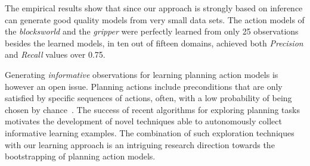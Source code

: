 \documentclass{article}
\begin{document}
The empirical results show that since our approach is strongly based on inference can generate good quality models from very small data sets. The action models of the {\em blocksworld} and the {\em gripper} were perfectly learned from only 25 observations besides the learned models, in ten out of fifteen domains, achieved both {\em Precision} and {\em Recall} values over 0.75.

Generating {\em informative} observations for learning planning action models is however an open issue. Planning actions include preconditions that are only satisfied by specific sequences of actions, often, with a low probability of being chosen by chance~\cite{fern2004learning}. The success of recent algorithms for exploring planning tasks~\cite{geffner:novelty:IJCAI17} motivates the development of novel techniques able to autonomously collect informative learning examples. The combination of such exploration techniques with our learning approach is an intriguing research direction towards the bootstrapping of planning action models.












\end{document}

